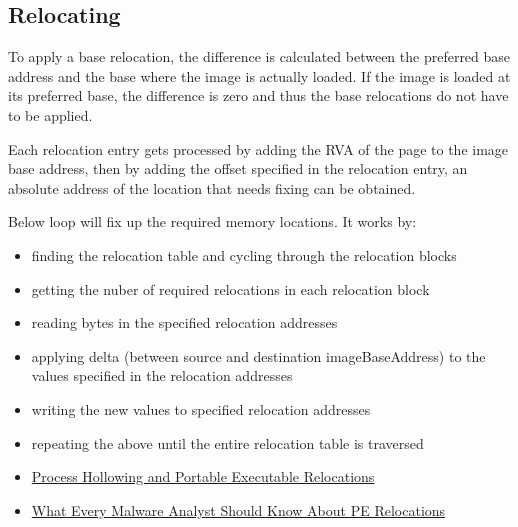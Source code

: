 \subsection{Relocating}
To apply a base relocation, the difference is calculated between the preferred base address and the base where the image is actually loaded. If the image is loaded at its preferred base, the difference is zero and thus the base relocations do not have to be applied.

Each relocation entry gets processed by adding the RVA of the page to the image base address, then by adding the offset specified in the relocation entry, an absolute address of the location that needs fixing can be obtained.

Below loop will fix up the required memory locations. It works by:
\begin{itemize}
    \item finding the relocation table and cycling through the relocation blocks
    \item getting the nuber of required relocations in each relocation block
    \item reading bytes in the specified relocation addresses
    \item applying delta (between source and destination imageBaseAddress) to the values specified in the relocation addresses
    \item writing the new values to specified relocation addresses
    \item repeating the above until the entire relocation table is traversed
\end{itemize}



\begin{itemize}
    \item \href{https://www.ired.team/offensive-security/code-injection-process-injection/process-hollowing-and-pe-image-relocations}{Process Hollowing and Portable Executable Relocations}
    \item \href{http://malwareid.in/unpack/unpacking-basics/pe-relocation-table}{What Every Malware Analyst Should Know About PE Relocations}
\end{itemize}